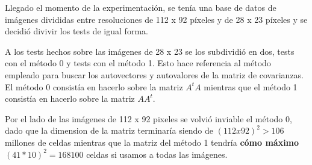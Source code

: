 Llegado el momento de la experimentación, se tenía una base de datos de imágenes divididas entre
resoluciones de 112 x 92 píxeles y de 28 x 23 píxeles y se decidió divivir los tests de igual forma.

A los tests hechos sobre las imágenes de 28 x 23 se los subdividió en dos, tests con el método 0 y
tests con el método 1. Esto hace referencia al método empleado para buscar los autovectores y
autovalores de la matriz de covarianzas. El método 0 consistía en hacerlo sobre la matriz $A^t A$
mientras que el método 1 consistía en hacerlo sobre la matriz $A A^t$.

Por el lado de las imágenes de 112 x 92 pixeles se volvió inviable el método 0, dado que la
dimension de la matriz terminaría siendo de $(112x92)^2 > 106$ millones de celdas mientras que la
matriz del método 1 tendría \textbf{cómo máximo} $(41*10)^2 = 168 100$ celdas si usamos a todas las
imágenes.
